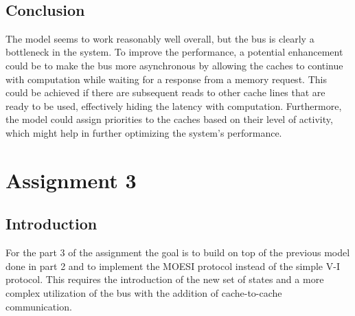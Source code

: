 \\

\subsection{Conclusion}
The model seems to work reasonably well overall, but the bus is clearly a bottleneck in the system. To improve the performance, a potential enhancement could be to make the bus more asynchronous by allowing the caches to continue with computation while waiting for a response from a memory request. This could be achieved if there are subsequent reads to other cache lines that are ready to be used, effectively hiding the latency with computation. Furthermore, the model could assign priorities to the caches based on their level of activity, which might help in further optimizing the system's performance.




\newpage
\section{Assignment 3}

\subsection{Introduction}
For the part 3 of the assignment the goal is to build on top of the previous model done in part 2 and to implement the MOESI protocol instead of the simple V-I protocol. This requires the introduction of the new set of states and a more complex utilization of the bus with the addition of cache-to-cache communication.  


